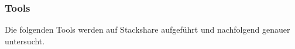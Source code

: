 \subsubsection{Tools}\label{ci_services_tools}

Die folgenden Tools werden auf Stackshare aufgeführt und nachfolgend genauer untersucht.





